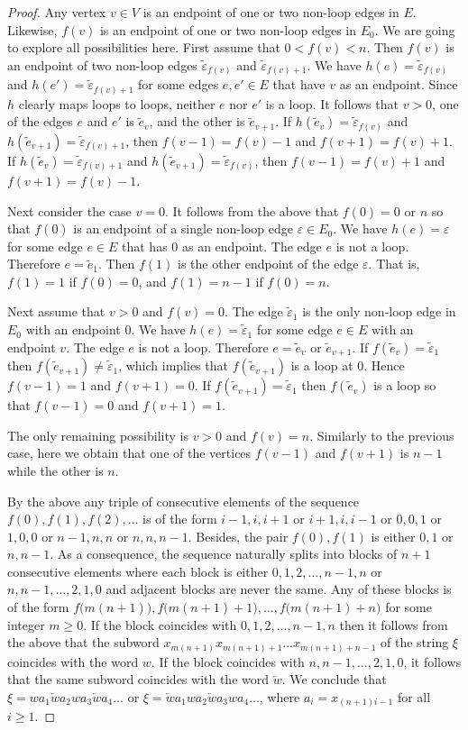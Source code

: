 \documentclass[12pt]{article}
\theoremstyle{definition}
\def\eps{\varepsilon}
\begin{document}
\begin{proof}
Any vertex $v\in V$ is an endpoint of one or two non-loop edges in $E$.  
Likewise, $f(v)$ is an endpoint of one or two non-loop edges in $E_0$.  We 
are going to explore all possibilities here.  First assume that 
$0<f(v)<n$.  Then $f(v)$ is an endpoint of two non-loop edges 
$\tilde\eps_{f(v)}$ and $\tilde\eps_{f(v)+1}$.  We have 
$h(e)=\tilde\eps_{f(v)}$ and $h(e')=\tilde\eps_{f(v)+1}$ for some edges 
$e,e'\in E$ that have $v$ as an endpoint.  Since $h$ clearly maps loops to 
loops, neither $e$ nor $e'$ is a loop.  It follows that $v>0$, one of the 
edges $e$ and $e'$ is $\tilde e_v$, and the other is $\tilde e_{v+1}$.  If 
$h(\tilde e_v)=\tilde\eps_{f(v)}$ and $h(\tilde 
e_{v+1})=\tilde\eps_{f(v)+1}$, then $f(v-1)=f(v)-1$ and $f(v+1)=f(v)+1$.  
If $h(\tilde e_v)=\tilde\eps_{f(v)+1}$ and $h(\tilde 
e_{v+1})=\tilde\eps_{f(v)}$, then $f(v-1)=f(v)+1$ and $f(v+1)=f(v)-1$.

Next consider the case $v=0$.  It follows from the above that $f(0)=0$ or 
$n$ so that $f(0)$ is an endpoint of a single non-loop edge $\eps\in E_0$.  
We have $h(e)=\eps$ for some edge $e\in E$ that has $0$ as an endpoint.  
The edge $e$ is not a loop.  Therefore $e=\tilde e_1$.  Then $f(1)$ is the 
other endpoint of the edge $\eps$.  That is, $f(1)=1$ if $f(0)=0$, and 
$f(1)=n-1$ if $f(0)=n$.

Next assume that $v>0$ and $f(v)=0$.  The edge $\tilde\eps_1$ is the only 
non-loop edge in $E_0$ with an endpoint $0$.  We have $h(e)=\tilde\eps_1$ 
for some edge $e\in E$ with an endpoint $v$.  The edge $e$ is not a loop.  
Therefore $e=\tilde e_v$ or $\tilde e_{v+1}$.  If $f(\tilde 
e_v)=\tilde\eps_1$ then $f(\tilde e_{v+1})\ne\tilde\eps_1$, which implies 
that $f(\tilde e_{v+1})$ is a loop at $0$.  Hence $f(v-1)=1$ and 
$f(v+1)=0$.  If $f(\tilde e_{v+1})=\tilde\eps_1$ then $f(\tilde e_v)$ is a 
loop so that $f(v-1)=0$ and $f(v+1)=1$.

The only remaining possibility is $v>0$ and $f(v)=n$.  Similarly to the 
previous case, here we obtain that one of the vertices $f(v-1)$ and 
$f(v+1)$ is $n-1$ while the other is $n$.

By the above any triple of consecutive elements of the sequence 
$f(0),f(1),f(2),\dots$ is of the form $i-1,i,i+1$ or $i+1,i,i-1$ or $0,0,1$ 
or $1,0,0$ or $n-1,n,n$ or $n,n,n-1$.  Besides, the pair $f(0),f(1)$ is 
either $0,1$ or $n,n-1$.  As a consequence, the sequence naturally splits 
into blocks of $n+1$ consecutive elements where each block is either 
$0,1,2,\dots,n-1,n$ or $n,n-1,\dots,2,1,0$ and adjacent blocks are never 
the same.  Any of these blocks is of the form
$f\bigl(m(n+1)\bigr),f\bigl(m(n+1)+1\bigr),\dots,f\bigl(m(n+1)+n\bigr)$ for 
some integer $m\ge0$.  If the block coincides with $0,1,2,\dots,n-1,n$ then 
it follows from the above that the subword $x_{m(n+1)}x_{m(n+1)+1}\ldots 
x_{m(n+1)+n-1}$ of the string $\xi$ coincides with the word $w$.  If the 
block coincides with $n,n-1,\dots,2,1,0$, it follows that the same subword 
coincides with the word $\overleftarrow{w}$.  We conclude that 
$\xi=wa_1\overleftarrow{w}a_2wa_3\overleftarrow{w}a_4\ldots$ or 
$\xi=\overleftarrow{w}a_1wa_2\overleftarrow{w}a_3wa_4\ldots$, where 
$a_i=x_{(n+1)i-1}$ for all $i\ge1$.
\end{proof}
\end{document}

